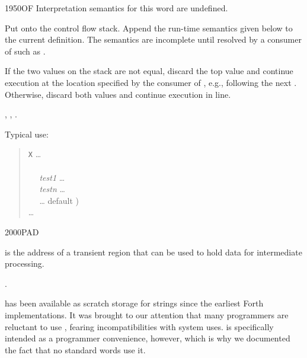 \begin{worddef}{1950}{OF}
\interpret
	Interpretation semantics for this word are undefined.

\compile

	Put  onto the control flow stack. Append the
	run-time semantics given below to the current definition.
	The semantics are incomplete until resolved by a consumer
	of  such as .

\runtime

	If the two values on the stack are not equal, discard the
	top value and continue execution at the location specified
	by the consumer of , e.g., following the next
	. Otherwise, discard both values and continue
	execution in line.

\see {},
	,
	.

	\begin{defer}
	\rationale %
		Typical use:
		\begin{quote}
			\word{:} \texttt{X} {\ldots} \\
			\tab {} \\
			\tab~~ \emph{test1}  {\ldots}  \\
			\tab~~ \emph{testn}  {\ldots}  \\
			\tab~~ {\ldots}  default ) \\
			\tab {} {\ldots} \\
			\word{;}
		\end{quote}
	\end{defer}
\end{worddef}


\begin{worddef}{2000}{PAD}
\item {}

	 is the address of a transient region that can
	be used to hold data for intermediate processing.

\see {}.

	\begin{defer}
	\rationale %
		 has been available as scratch storage for strings
		since the earliest Forth implementations. It was brought to
		our attention that many programmers are reluctant to use
		, fearing incompatibilities with system uses.
		 is specifically intended as a programmer convenience,
		however, which is why we documented the fact that no standard
		words use it.
	\end{defer}
\end{worddef}


